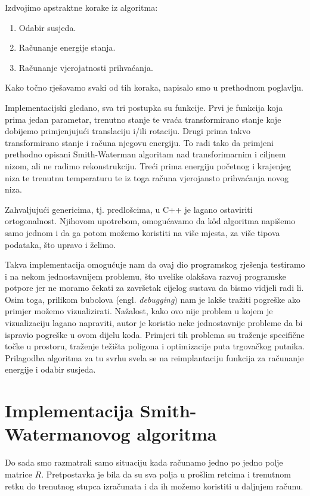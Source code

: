 \documentclass[times, utf8, zavrsni]{fer}
\begin{document}
Izdvojimo apstraktne korake iz algoritma:
\begin{enumerate}
\item 
Odabir susjeda.

\item
Računanje energije stanja.

\item
Računanje vjerojatnosti prihvaćanja.
\end{enumerate}
Kako točno rješavamo svaki od tih koraka, napisalo smo u
prethodnom poglavlju. 

Implementacijski gledano, sva tri postupka su funkcije.
Prvi je funkcija koja prima jedan parametar, trenutno stanje
te vraća transformirano stanje koje dobijemo primjenjujući
translaciju i/ili rotaciju.
Drugi prima takvo transformirano stanje i računa njegovu
energiju. To radi tako da primjeni prethodno opisani
Smith-Waterman algoritam nad transforimarnim i ciljnem
nizom, ali ne radimo rekonstrukciju. 
Treći prima energiju početnog i krajenjeg niza te trenutnu
temperaturu te iz toga računa vjerojansto prihvaćanja
novog niza. 

Zahvaljujući genericima, tj. predlošcima, u C++ je lagano
ostaviriti ortogonalnost. Njihovom upotrebom, omogućavamo
da kôd algoritma napišemo samo jednom i da ga potom možemo
koristiti na više mjesta, za više tipova podataka,
što upravo i želimo. 

Takva implementacija omogućuje nam da ovaj dio programskog
rješenja testiramo i na nekom jednostavnijem problemu, što
uvelike olakšava razvoj programske potpore jer ne moramo
čekati za završetak cijelog sustava da bismo vidjeli radi li.
Osim toga, prilikom bubolova (engl. \textit{debugging}) nam
je lakše tražiti pogreške ako primjer možemo vizualizirati.
Nažalost, kako ovo nije problem u kojem je vizualizaciju
lagano napraviti, autor je koristio neke jednostavnije
probleme da bi ispravio pogreške u ovom dijelu koda. Primjeri
tih problema su traženje specifične točke u prostoru, 
traženje težišta poligona i optimizacije puta trgovačkog putnika. 
Prilagodba algoritma za tu svrhu svela se na reimplantaciju
funkcija za računanje energije i odabir susjeda. 


\section{Implementacija Smith-Watermanovog algoritma}
Do sada smo razmatrali samo situaciju kada računamo jedno
po jedno polje matrice $R$. Pretpostavka je bila da su 
sva polja u prošlim retcima i trenutnom retku do trenutnog
stupca izračunata i da ih možemo koristiti u daljnjem
računu. 
\end{document}
